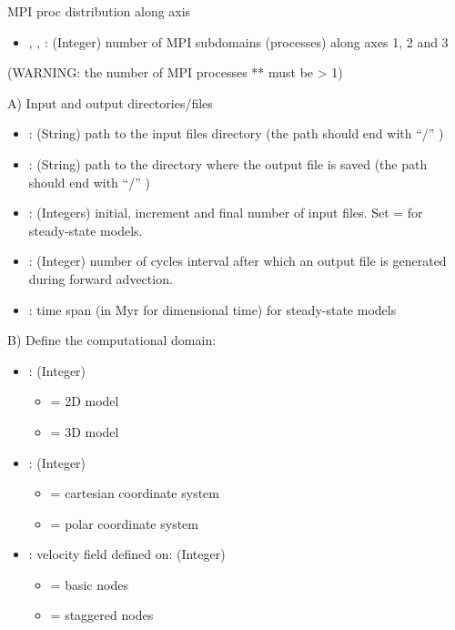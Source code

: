 MPI proc distribution along axis
\begin{itemize}
    \item {}, , : (Integer) number of MPI subdomains (processes) along axes 1, 2 and 3
\end{itemize}
(WARNING: the number of MPI processes ** must be > 1)
\vspace{1cm}

A) Input and output directories/files
\begin{itemize}
    \item {}: (String) path to the input \vtptitle{} files directory (the path should end with  “/” )
    \item {}: (String) path to the directory where the output \cijkltitle{} file is saved (the path should end with  “/” )
    \item {}: (Integers) initial, increment and final number of input \vtptitle{} files. Set  =  for steady-state models. 
    \item {}: (Integer) number of cycles interval after which an output file is generated during forward advection.
    \item {}: time span (in Myr for dimensional time) for steady-state models
\end{itemize}
\vspace{1cm}

B) Define the computational domain:
\begin{itemize}
    \item {}: (Integer)
        \begin{itemize}
         \item[]  = 2D model
         \item[]  = 3D model
        \end{itemize}
    \item {}:  (Integer) 
        \begin{itemize}
         \item[]  = cartesian coordinate system
         \item[]  = polar coordinate system
        \end{itemize}
    \item {}: velocity field defined on:  (Integer) 
        \begin{itemize}
         \item[]  = basic nodes
         \item[]  = staggered nodes\footnotemark
    \end{itemize}
\end{itemize}

